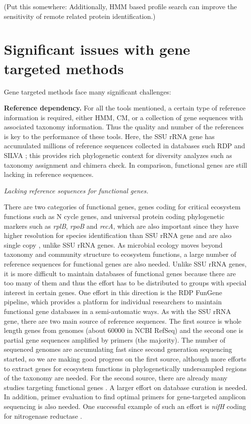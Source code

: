 \documentclass[]{msu-thesis}
\begin{document}
(Put this somewhere: Additionally,
HMM based profile search can improve the sensitivity of remote related
protein identification.)

\section{Significant issues with gene targeted methods}

Gene targeted methods face many significant challenges:

\textbf{Reference dependency.} For all the tools mentioned, a certain
type of reference information is required, either HMM, CM, or a
collection of gene sequences with associated taxonomy
information. Thus the quality and number of the references is key to
the performance of these tools. Here, the SSU rRNA gene has
accumulated millions of reference sequences collected in 
databases such RDP and SILVA
\cite{cole_ribosomal_2014,quast_silva_2013}; this provides rich
phylogenetic context for diversity analyzes such as taxonomy
assignment and chimera check.  In comparison, functional
genes are still lacking in reference sequences.

\textit{Lacking reference sequences for functional genes. }

There are two categories of functional genes, genes coding for
critical ecosystem functions such as N cycle genes, and universal
protein coding phylogenetic markers such as \textit{rplB},
\textit{rpoB} and \textit{recA}, which are also important since they
have higher resolution for species identification than SSU rRNA
gene and are also single copy
\cite{case_use_2007,roux_comparison_2011}, unlike SSU rRNA genes.
As microbial ecology moves beyond
taxonomy and community structure to ecosystem functions, a large
number of reference sequences for functional genes are also
needed. Unlike SSU rRNA genes, it is more difficult to maintain
databases of functional genes because there are too many of them and
thus the effort has to be distributed to groups with special interest
in certain genes. One effort in this direction is the RDP FunGene
pipeline, which provides a platform for individual researchers to
maintain functional gene databases in a semi-automatic ways. As with
the SSU rRNA gene, there are two main source of reference sequences. The
first source is whole length genes from genomes (about 60000 in NCBI
RefSeq) and the second one is partial gene sequences amplified by
primers (the majority). The number of sequenced genomes are
accumulating fast since second generation sequencing started, so we
are making good progress on the first source, although more efforts
to extract genes for ecosystem functions in phylogenetically undersampled
regions of the taxonomy are needed. For the second source, there are already many studies
targeting functional genes
\cite{penton_functional_2013,hai_quantification_2009,treusch_novel_2005,huang_biodiversity_2011}.  A larger
effort on database curation is needed. In addition, primer evaluation
to find optimal primers for gene-targeted amplicon sequencing is also needed. One successful example of such an
effort is \textit{nifH} coding for nitrogenase reductase
\cite{gaby_comprehensive_2014,gaby_comprehensive_2012}.
\end{document}
